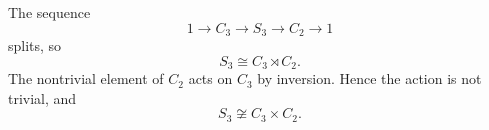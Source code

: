 \begin{example}
\label{example-s3-semidirect}
The sequence
$$
1\longrightarrow C_3
\longrightarrow S_3
\longrightarrow C_2
\longrightarrow1
$$
splits, so
$$
S_3\cong C_3\rtimes C_2.
$$
The nontrivial element of $C_2$ acts on
$C_3$ by inversion. Hence the action is not
trivial, and
$$
S_3\not\cong C_3\times C_2.
$$
\end{example}


